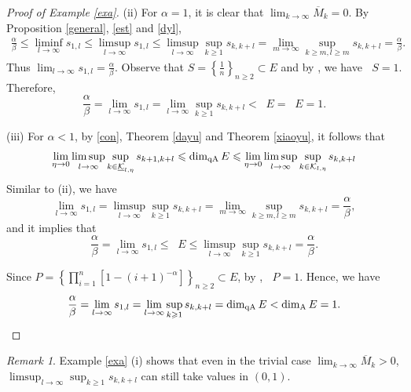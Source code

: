 \documentclass[12pt]{amsart}
\numberwithin{equation}{section}
\theoremstyle{plain}
\newtheorem{theorem}{Theorem}[section]
\theoremstyle{remark}
\newtheorem{remark}[theorem]{Remark}
\theoremstyle{definition}
\newcommand{\kk}{\mathcal{K}}
\newcommand{\uk}{\underline{\mathcal{K}}}
\newcommand{\om}{\overline{M}}
\newcommand{\f}{\frac}
\renewcommand{\ge}{\geqslant}
\renewcommand{\le}{\leqslant}
\DeclareMathOperator{\dima}{dim_A}
\DeclareMathOperator{\dimqa}{dim_{qA}}
\begin{document}
\begin{proof}[Proof of Example \ref{exa}]
		(ii) For $\alpha=1$, it is clear that $\lim_{k\to\infty}\om_k=0$. By Proposition \ref{general}, \eqref{est} and \eqref{dyl},
		\begin{align*}
			\f\alpha\beta\le\liminf_{l\to\infty}s_{1,l}\le\limsup_{l\to\infty}s_{1,l}\le \limsup_{l\to\infty}\sup_{k\ge 1}s_{k,k+l}=\lim_{m\to\infty}\sup_{k\ge m,l\ge m}s_{k,k+l}=\f\alpha\beta.
		\end{align*}
		Thus $\lim_{l\to\infty}s_{1,l}=\f\alpha\beta$.
		Observe that $S=\left\{\f 1n\right\}_{n\ge2}\subset E$ and by \cite[Theorem 3.4.7]{fraser2020assouad}, we have  $\dimqa S=1$. Therefore,
		\[
		\f\alpha\beta=\lim_{l\to\infty} s_{1,l}=\lim_{l\to\infty}\sup_{k\ge 1} s_{k,k+l}<\dimqa E=\dima E=1.
		\]
		
		(iii) For $\alpha<1$,  by \eqref{con}, Theorem \ref{dayu} and Theorem \ref{xiaoyu}, it follows that 
		$$
		\lim_{\eta\to 0}\limsup_{l\to\infty}\sup_{k\in \uk_{l,\eta}} s_{k+1,k+l}\\
		\le \dimqa E  \le\lim_{\eta\to 0}\limsup_{l\to\infty}\sup_{k\in \kk_{l,\eta}} s_{k,k+l}
		$$
		Similar to (ii), we have 
		\[
		\lim_{l\to\infty}s_{1,l}=\limsup_{l\to\infty}\sup_{k\ge 1} s_{k,k+l}=\lim_{m\to\infty}\sup_{k\ge m,l\ge m}s_{k,k+l}=\f\alpha\beta,
		\]
		and it implies that 
		$$
		\f\alpha\beta=\lim_{l\to\infty}s_{1,l}  \le \dimqa E \le \limsup_{l\to\infty}\sup_{k\ge 1} s_{k,k+l}	=\f\alpha\beta.
		$$
		
		Since $P=\left\{\prod_{i=1}^n\left[1-(i+1)^{-\alpha}\right]\right\}_{n\ge 2}\subset E$, by \cite[Example 1.12]{lu2016quasi}, $\dima P=1$.  Hence, we  have
		\[
		\f\alpha\beta=\lim_{l\to\infty} s_{1,l}=\lim_{l\to\infty}\sup_{k\ge 1} s_{k,k+l}=\dimqa E<\dima E=1. \qedhere
		\]
	\end{proof}
	\begin{remark}
		Example \ref{exa} (i) shows that even in the trivial case $\lim_{k\to\infty} \om_k>0$, $\limsup_{l\to\infty}\sup_{k\ge 1} s_{k,k+l}$ can still take values in $(0,1)$.
	\end{remark}

\end{document}
